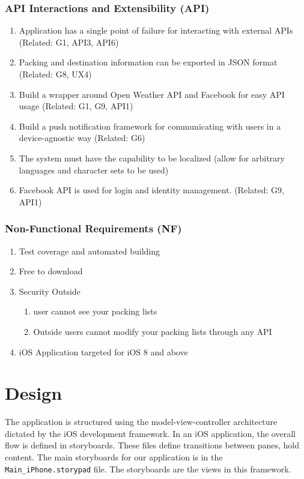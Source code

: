 \documentclass[11pt]{article}
\begin{document}
        \subsubsection{API Interactions and Extensibility (API)}
        \begin{enumerate}
        \item Application has a single point of failure for interacting with external
        APIs (Related: G1, API3, API6)
        \item Packing and destination information can be exported in JSON format
        (Related: G8, UX4)
        \item Build a wrapper around Open Weather API and Facebook for easy API
        usage (Related: G1, G9, API1)
        \item Build a push notification framework for communicating with users in
        a device-agnostic way (Related: G6)
        \item The system must have the capability to be localized (allow for arbitrary
        languages and character sets to be used)
        \item Facebook API is used for login and identity management. (Related:
        G9, API1)
        \end{enumerate}

        \subsubsection{Non-Functional Requirements (NF)}
        \begin{enumerate}
        \item Test coverage and automated building 
        \item Free to download 
        \item Security Outside 

        \begin{enumerate}
        \item user cannot see your packing lists 
        \item Outside users cannot modify your packing lists through any API 
        \end{enumerate}
        \item iOS Application targeted for iOS 8 and above \end{enumerate}


\section{Design}
    The application is structured using the model-view-controller architecture dictated by the iOS development framework. In an iOS application, the overall flow is defined in storyboards. These files define transitions between panes, hold content. The main storyboards for our application is in the \texttt{Main\_iPhone.storypad} file. The storyboards are the views in this framework.
\end{document}
